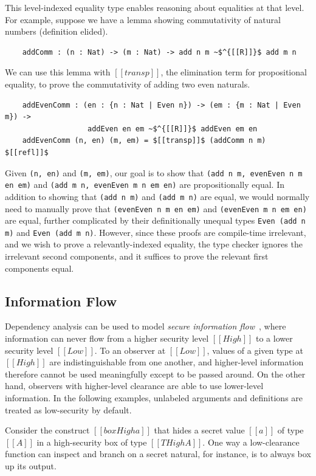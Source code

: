 \documentclass[acmsmall]{acmart}
\begin{document}
This level-indexed equality type enables reasoning about equalities at that level.
For example, suppose we have a lemma showing commutativity of natural numbers (definition elided).
\begin{lstlisting}
    addComm : (n : Nat) -> (m : Nat) -> add n m ~$^{[[R]]}$ add m n
\end{lstlisting}
We can use this lemma with $[[transp]]$, the elimination term for
propositional equality, to prove the commutativity of adding two even
naturals.

\begin{lstlisting}
    addEvenComm : (en : {n : Nat | Even n}) -> (em : {m : Nat | Even m}) ->
                   addEven en em ~$^{[[R]]}$ addEven em en
    addEvenComm (n, en) (m, em) = $[[transp]]$ (addComm n m) $[[refl]]$
\end{lstlisting}

Given \lstinline{(n, en)} and \lstinline{(m, em)},
our goal is to show that \lstinline{(add n m, evenEven n m en em)}
and \lstinline{(add m n, evenEven m n em en)} are propositionally equal.
In addition to showing that \lstinline{(add n m)} and \lstinline{(add m n)} are equal,
we would normally need to manually prove that \lstinline{(evenEven n m en em)}
and \lstinline{(evenEven m n em en)} are equal,
further complicated by their definitionally unequal types \lstinline{Even (add n m)}
and \lstinline{Even (add m n)}.
However, since these proofs are compile-time irrelevant,
and we wish to prove a relevantly-indexed equality,
the type checker ignores the irrelevant second components,
and it suffices to prove the relevant first components equal.

\subsection{Information Flow}

Dependency analysis can be used to model \textit{secure information flow}~\citep{denning1977infoflow},
where information can never flow from a higher security level $[[High]]$
to a lower security level $[[Low]]$.
To an observer at $[[Low]]$, values of a given type at $[[High]]$ are
indistinguishable from one another,
and higher-level information therefore cannot be used meaningfully
except to be passed around.
On the other hand, observers with higher-level clearance are able to use lower-level information.
In the following examples, unlabeled arguments and definitions are treated as low-security by default.

Consider the construct $[[box High a]]$
that hides a secret value $[[a]]$ of type $[[A]]$
in a high-security box of type $[[T High A]]$. 
One way a low-clearance function can inspect and branch on a secret natural,
for instance, is to always box up its output.
\end{document}
